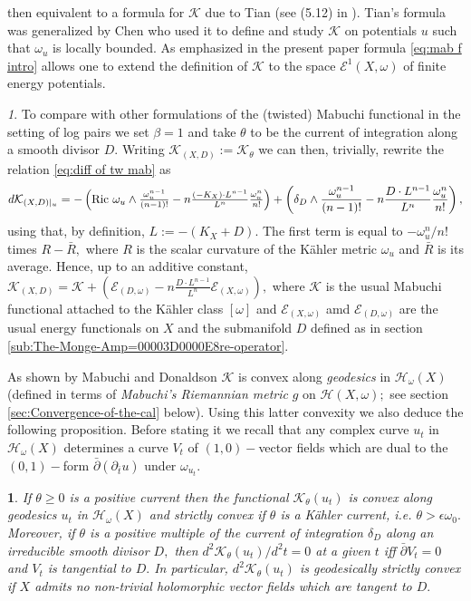 \documentclass[11pt,oneside,english]{amsart}
\numberwithin{equation}{section}
\numberwithin{figure}{section}
\theoremstyle{plain}
\theoremstyle{plain}
\theoremstyle{plain}
\theoremstyle{plain}
\newtheorem{prop}[thm]{\protect\propositionname}
\theoremstyle{remark}
\newtheorem{rem}[thm]{\protect\remarkname}
\theoremstyle{definition}
\providecommand{\propositionname}{Proposition}
\providecommand{\remarkname}{Remark}
\begin{document}
then equivalent to a formula for \emph{$\mathcal{K}$} due to Tian
(see (5.12) in \cite{ti3}). Tian's formula was generalized by Chen
\cite{ch2} who used it to define and study $\mathcal{K}$ on potentials
$u$ such that $\omega_{u}$ is locally bounded. As emphasized in
the present paper formula \ref{eq:mab f intro} allows one to extend
the definition of $\mathcal{K}$ to the space $\mathcal{E}^{1}(X,\omega)$
of finite energy potentials. 
\begin{rem}
To compare with other formulations of the (twisted) Mabuchi functional
in the setting of log pairs we set $\beta=1$ and take $\theta$ to
be the current of integration along a smooth divisor $D.$ Writing
$\mathcal{K}_{(X,D)}:=\mathcal{K}_{\theta}$ we can then, trivially,
rewrite the relation \ref{eq:diff of tw mab} as 
\[
d\mathcal{K}_{(X,D)|_{u}}=-\left(\mbox{Ric \ensuremath{\omega_{u}\wedge\frac{\omega_{u}^{n-1}}{(n-1)!}-n\frac{(-K_{X})\cdot L^{n-1}}{L^{n}}\frac{\omega_{u}^{n}}{n!}}}\right)+\left(\delta_{D}\wedge\frac{\omega_{u}^{n-1}}{(n-1)!}-n\frac{D\cdot L^{n-1}}{L^{n}}\frac{\omega_{u}^{n}}{n!}\right),
\]
 using that, by definition, $L:=-(K_{X}+D).$ The first term is equal
to $-\omega_{u}^{n}/n!$ times $R-\bar{R},$ where $R$ is the scalar
curvature of the Kähler metric $\omega_{u}$ and $\bar{R}$ is its
average. Hence, up to an additive constant, $\mathcal{K}_{(X,D)}=\mathcal{K}+(\mathcal{E}_{(D,\omega)}-n\frac{D\cdot L^{n-1}}{L^{n}}\mathcal{E}_{(X,\omega)}),$
where $\mathcal{K}$ is the usual Mabuchi functional attached to the
Kähler class $[\omega]$ and $\mathcal{E}_{(X,\omega)}$ amd $\mathcal{E}_{(D,\omega)}$
are the usual energy functionals on $X$ and the submanifold $D$
defined as in section \ref{sub:The-Monge-Amp=00003D0000E8re-operator}.
\end{rem}
As shown by Mabuchi \cite{m1} and Donaldson $\mathcal{K}$ is convex
along \emph{geodesics} in $\mathcal{H}_{\omega}(X)$ (defined in terms
of \emph{Mabuchi's Riemannian metric} $g$ on $\mathcal{H}(X,\omega);$
see section \ref{sec:Convergence-of-the-cal} below). Using this latter
convexity we also deduce the following proposition. Before stating
it we recall that any complex curve $u_{t}$ in $\mathcal{H}_{\omega}(X)$
determines a curve $V_{t}$ of $(1,0)-$vector fields which are dual
to the $(0,1)-$form $\bar{\partial}(\partial_{\bar{t}}u)$ under
$\omega_{u_{t}}.$ 
\begin{prop}
\label{pro:convexity of twisted mab}If $\theta\geq0$ is a positive
current then the functional $\mathcal{K}_{\theta}(u_{t})$ is convex
along geodesics $u_{t}$ in $\mathcal{H}_{\omega}(X)$ and strictly
convex if $\theta$ is a Kähler current, i.e. $\theta>\epsilon\omega_{0}.$
Moreover, if $\theta$ is a positive multiple of the current of integration
$\delta_{D}$ along an irreducible smooth divisor $D,$ then $d^{2}\mathcal{K}_{\theta}(u_{t})/d^{2}t=0$
at a given $t$ iff $\bar{\partial}V_{t}=0$ and $V_{t}$ is tangential
to $D.$ In particular, $d^{2}\mathcal{K}_{\theta}(u_{t})$ is geodesically
strictly convex if $X$ admits no non-trivial holomorphic vector fields
which are tangent to $D.$\end{prop}
\end{document}
